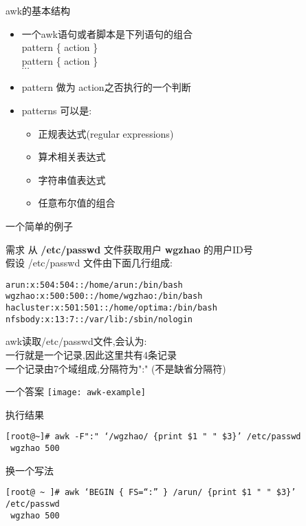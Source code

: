 \begin{frame}{awk的基本结构}
\begin{itemize}
\item 一个awk语句或者脚本是下列语句的组合 \\
\alert{pattern}   \{ action \} \\
\alert{pattern}   \{ action \} \\
$\cdots$

\item \alert{pattern} 做为 action之否执行的一个判断
\item patterns 可以是:
	\begin{itemize}
		\item 正规表达式(regular expressions)
		\item 算术相关表达式
		\item 字符串值表达式
		\item 任意布尔值的组合
	\end{itemize}
\end{itemize}
\end{frame}

\begin{frame}[fragile]{一个简单的例子}
\begin{exampleblock}{需求}
从 \textbf{/etc/passwd} 文件获取用户 \textbf{wgzhao} 的用户ID号 \\
假设 /etc/passwd 文件由下面几行组成: \\
\begin{verbatim}
arun:x:504:504::/home/arun:/bin/bash
wgzhao:x:500:500::/home/wgzhao:/bin/bash
hacluster:x:501:501::/home/optima:/bin/bash
nfsbody:x:13:7::/var/lib:/sbin/nologin
\end{verbatim}

awk读取/etc/passwd文件,会认为:  \\
一行就是一个记录,因此这里共有4条记录 \\
一个记录由7个域组成,分隔符为":" (不是缺省分隔符)
\end{exampleblock}
\end{frame}

\begin{frame}{一个答案}
\texttt{[image: awk-example]}
\end{frame}

\begin{frame}[fragile]{执行结果}
\begin{verbatim}
[root@~]# awk -F":" ‘/wgzhao/ {print $1 " " $3}’ /etc/passwd 
 wgzhao 500
\end{verbatim}

换一个写法
\begin{verbatim}
[root@ ~ ]# awk ‘BEGIN { FS=“:” } /arun/ {print $1 " " $3}’ /etc/passwd 
 wgzhao 500
\end{verbatim}
\end{frame}

